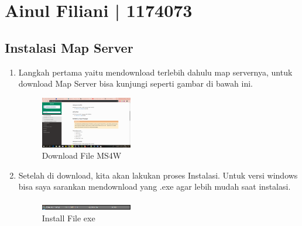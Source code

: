 \section{Ainul Filiani | 1174073}
\subsection{Instalasi Map Server}
\begin{enumerate}
    \item Langkah pertama yaitu mendownload terlebih dahulu map servernya, untuk download Map Server bisa kunjungi seperti gambar di bawah ini.
  \hfill\break
  \begin{figure}[H]
  \includegraphics[width=4cm]{figures/tugas4/1174073/1.png}
  \centering
  \caption{Download File MS4W}
  \end{figure}
    
   

    \item Setelah di download, kita akan lakukan proses Instalasi. Untuk versi windows bisa saya sarankan mendownload yang .exe agar lebih mudah saat instalasi.
   
    
  \hfill\break
  \begin{figure}[H]
  \includegraphics[width=4cm]{figures/tugas4/1174073/2.png}
  \centering
  \caption{Install File exe}
  \end{figure}
    
    

\end{enumerate}


